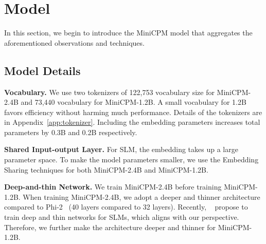 \section{Model}
In this section, we begin to introduce the MiniCPM model that aggregates the aforementioned observations and techniques. 
\label{sec:model}
\begin{table}[htbp]
    \centering
{}
    \caption{Model configurations for MiniCPM. N (B), $d_m$, $d_{ff}$, $d_h$, $n_q$, $n_{kv}$, $L$, Batch size (M), Tokens (T) represents the number of non-embedding parameters of the model, model hidden dimension, feedforward layer bottleneck dimension, attention head dimension, number of queries, number key/values, number of layers, training batch size, total training tokens.}
    \label{tab:model_configs}
\end{table}

\subsection{Model Details}
\noindent\textbf{Vocabulary.} We use two tokenizers of 122,753 vocabulary size for MiniCPM-2.4B and 73,440 vocabulary for MiniCPM-1.2B. A small vocabulary for 1.2B favors efficiency without harming much performance. Details of the tokenizers are in Appendix~\ref{app:tokenizer}. Including the embedding parameters increases total parameters by 0.3B and 0.2B respectively. 


\noindent\textbf{Shared Input-output Layer.}
For SLM, the embedding takes up a large parameter space. To make the model parameters smaller, we use the Embedding Sharing techniques for both MiniCPM-2.4B and MiniCPM-1.2B.

\noindent\textbf{Deep-and-thin Network.} We train MiniCPM-2.4B before training MiniCPM-1.2B. When training MiniCPM-2.4B, we adopt a deeper and thinner architecture compared to Phi-2~\citep{Javaheripi2023Phi2} (40 layers compared to 32 layers). Recently, ~\cite{liu2024mobilellm} propose to train deep and thin networks for SLMs, which aligns with our perspective. Therefore, we further make the architecture deeper and thinner for MiniCPM-1.2B. 

